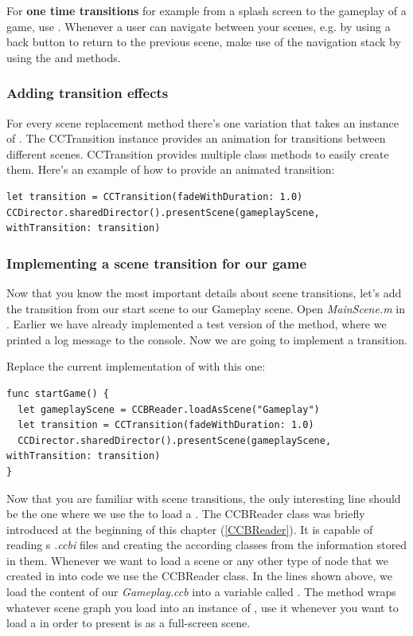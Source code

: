 \begin{details} 
For \textbf{one time transitions} for example from a splash screen to the
gameplay of a game, use . Whenever a user can navigate
between your scenes, e.g. by using a back button to return to the previous
scene, make use of the navigation stack by using the  and
 methods.
\end{details}

\subsubsection{Adding transition effects}
For every scene replacement method there's one variation that takes an instance
of . The CCTransition instance provides an animation
for transitions between different scenes. CCTransition provides multiple class
methods to easily create them. Here's an example of how to provide an animated
transition:
\begin{lstlisting}
let transition = CCTransition(fadeWithDuration: 1.0)
CCDirector.sharedDirector().presentScene(gameplayScene, withTransition: transition)
\end{lstlisting}

\subsubsection{Implementing a scene transition for our game}
Now that you know the most important details about scene transitions, let's add
the transition from our start scene to our Gameplay scene. Open
\textit{MainScene.m} in \xcode{}. Earlier we have already implemented a test
version of the  method, where we printed a log message to
the console. Now we are going to implement a transition. 
\begin{leftbar}
Replace the current implementation of  with this one:
\begin{lstlisting}
func startGame() {
  let gameplayScene = CCBReader.loadAsScene("Gameplay")
  let transition = CCTransition(fadeWithDuration: 1.0)
  CCDirector.sharedDirector().presentScene(gameplayScene, withTransition: transition)
}
\end{lstlisting}
\end{leftbar}

Now that you are familiar with scene transitions, the only interesting line
should be the one where we use the  to
load a \ccbfile{}. The CCBReader class was briefly introduced at the beginning
of this chapter (\ref{CCBReader}). It is capable of reading \SB{}s
\textit{.ccbi} files and creating the according \cocos{} classes from the
information stored in them. Whenever we want to load a scene or any
other type of node that we created in \SB{} into code we use the CCBReader
class. In the lines shown above, we load the content of our
\textit{Gameplay.ccb} into a variable called . The
 method wraps whatever scene graph you load into an
instance of , use it whenever you want to load a \ccbfile{}
in order to present is as a full-screen scene.

